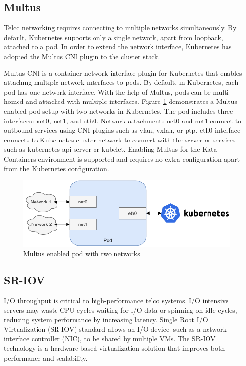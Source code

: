 \subsection{Multus}

Telco networking requires connecting to multiple networks simultaneously. By default, Kubernetes supports only a single network, apart from loopback, attached to a pod. In order to extend the network interface, Kubernetes has adopted the Multus CNI plugin to the cluster stack.

Multus CNI \cite{Multus} is a container network interface plugin for Kubernetes that enables attaching multiple network interfaces to pods. By default, in Kubernetes, each pod has one network interface. With the help of Multus, pods can be multi-homed and attached with multiple interfaces. Figure \ref{fig:Multus} demonstrates a Multus enabled pod setup with two networks in Kubernetes. The pod includes three interfaces: net0, net1, and eth0. Network attachments net0 and net1 connect to outbound services using CNI plugins such as vlan, vxlan, or ptp. eth0 interface connects to Kubernetes cluster network to connect with the server or services such as kubernetes-api-server or kubelet. Enabling Multus for the Kata Containers environment is supported and requires no extra configuration apart from the Kubernetes configuration. \cite{MultusUbuntu}

\begin{figure}[ht]
  \begin{center}
    \includegraphics[width=13.5cm]{images/Multus.pdf}
    \caption{Multus enabled pod with two networks}
    \label{fig:Multus}
  \end{center}
\end{figure}

\subsection{SR-IOV}
\label{section:SR-IOV}

I/O throughput is critical to high-performance telco systems. I/O intensive servers may waste CPU cycles waiting for I/O data or spinning on idle cycles, reducing system performance by increasing latency. Single Root I/O Virtualization (SR-IOV) standard allows an I/O device, such as a network interface controller (NIC), to be shared by multiple VMs. The SR-IOV technology is a hardware-based virtualization solution that improves both performance and scalability. \cite{Dong2012}

